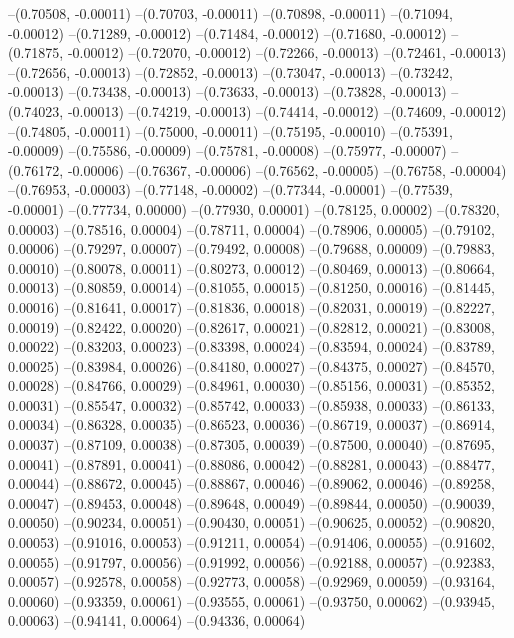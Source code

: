 --(0.70508, -0.00011)
--(0.70703, -0.00011)
--(0.70898, -0.00011)
--(0.71094, -0.00012)
--(0.71289, -0.00012)
--(0.71484, -0.00012)
--(0.71680, -0.00012)
--(0.71875, -0.00012)
--(0.72070, -0.00012)
--(0.72266, -0.00013)
--(0.72461, -0.00013)
--(0.72656, -0.00013)
--(0.72852, -0.00013)
--(0.73047, -0.00013)
--(0.73242, -0.00013)
--(0.73438, -0.00013)
--(0.73633, -0.00013)
--(0.73828, -0.00013)
--(0.74023, -0.00013)
--(0.74219, -0.00013)
--(0.74414, -0.00012)
--(0.74609, -0.00012)
--(0.74805, -0.00011)
--(0.75000, -0.00011)
--(0.75195, -0.00010)
--(0.75391, -0.00009)
--(0.75586, -0.00009)
--(0.75781, -0.00008)
--(0.75977, -0.00007)
--(0.76172, -0.00006)
--(0.76367, -0.00006)
--(0.76562, -0.00005)
--(0.76758, -0.00004)
--(0.76953, -0.00003)
--(0.77148, -0.00002)
--(0.77344, -0.00001)
--(0.77539, -0.00001)
--(0.77734, 0.00000)
--(0.77930, 0.00001)
--(0.78125, 0.00002)
--(0.78320, 0.00003)
--(0.78516, 0.00004)
--(0.78711, 0.00004)
--(0.78906, 0.00005)
--(0.79102, 0.00006)
--(0.79297, 0.00007)
--(0.79492, 0.00008)
--(0.79688, 0.00009)
--(0.79883, 0.00010)
--(0.80078, 0.00011)
--(0.80273, 0.00012)
--(0.80469, 0.00013)
--(0.80664, 0.00013)
--(0.80859, 0.00014)
--(0.81055, 0.00015)
--(0.81250, 0.00016)
--(0.81445, 0.00016)
--(0.81641, 0.00017)
--(0.81836, 0.00018)
--(0.82031, 0.00019)
--(0.82227, 0.00019)
--(0.82422, 0.00020)
--(0.82617, 0.00021)
--(0.82812, 0.00021)
--(0.83008, 0.00022)
--(0.83203, 0.00023)
--(0.83398, 0.00024)
--(0.83594, 0.00024)
--(0.83789, 0.00025)
--(0.83984, 0.00026)
--(0.84180, 0.00027)
--(0.84375, 0.00027)
--(0.84570, 0.00028)
--(0.84766, 0.00029)
--(0.84961, 0.00030)
--(0.85156, 0.00031)
--(0.85352, 0.00031)
--(0.85547, 0.00032)
--(0.85742, 0.00033)
--(0.85938, 0.00033)
--(0.86133, 0.00034)
--(0.86328, 0.00035)
--(0.86523, 0.00036)
--(0.86719, 0.00037)
--(0.86914, 0.00037)
--(0.87109, 0.00038)
--(0.87305, 0.00039)
--(0.87500, 0.00040)
--(0.87695, 0.00041)
--(0.87891, 0.00041)
--(0.88086, 0.00042)
--(0.88281, 0.00043)
--(0.88477, 0.00044)
--(0.88672, 0.00045)
--(0.88867, 0.00046)
--(0.89062, 0.00046)
--(0.89258, 0.00047)
--(0.89453, 0.00048)
--(0.89648, 0.00049)
--(0.89844, 0.00050)
--(0.90039, 0.00050)
--(0.90234, 0.00051)
--(0.90430, 0.00051)
--(0.90625, 0.00052)
--(0.90820, 0.00053)
--(0.91016, 0.00053)
--(0.91211, 0.00054)
--(0.91406, 0.00055)
--(0.91602, 0.00055)
--(0.91797, 0.00056)
--(0.91992, 0.00056)
--(0.92188, 0.00057)
--(0.92383, 0.00057)
--(0.92578, 0.00058)
--(0.92773, 0.00058)
--(0.92969, 0.00059)
--(0.93164, 0.00060)
--(0.93359, 0.00061)
--(0.93555, 0.00061)
--(0.93750, 0.00062)
--(0.93945, 0.00063)
--(0.94141, 0.00064)
--(0.94336, 0.00064)
